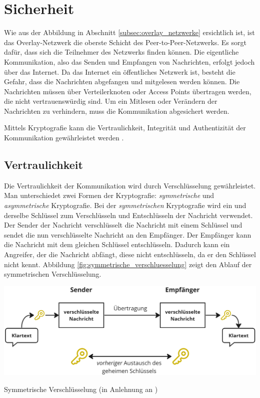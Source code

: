 \section{Sicherheit}
\label{sec:sicherheit_basics}

Wie aus der Abbildung in Abschnitt \ref{subsec:overlay_netzwerke} \textit{} ersichtlich ist, ist das Overlay-Netzwerk die oberste Schicht des Peer-to-Peer-Netzwerks. Es sorgt dafür, dass sich die Teilnehmer des Netzwerks finden können. Die eigentliche Kommunikation, also das Senden und Empfangen von Nachrichten, erfolgt jedoch über das Internet. Da das Internet ein öffentliches Netzwerk ist, besteht die Gefahr, dass die Nachrichten abgefangen und mitgelesen werden können. Die Nachrichten müssen über Verteilerknoten oder Access Points übertragen werden, die nicht vertrauenswürdig sind. Um ein Mitlesen oder Verändern der Nachrichten zu verhindern, muss die Kommunikation abgesichert werden. 

Mittels Kryptografie kann die Vertraulichkeit, Integrität und Authentizität der Kommunikation gewährleistet werden \Parencite[S. 7]{Hellmann_IT-Sicherheit}.


\subsection{Vertraulichkeit}
\label{subsec:vertraulichkeit_basics}

Die Vertraulichkeit der Kommunikation wird durch Verschlüsselung gewährleistet. Man unterschiedet zwei Formen der Kryptografie: \textit{symmetrische} und \textit{asymmetrische} Kryptografie. Bei der \textit{symmetrischen} Kryptografie wird ein und derselbe Schlüssel zum Verschlüsseln und Entschlüsseln der Nachricht verwendet. Der Sender der Nachricht verschlüsselt die Nachricht mit einem Schlüssel und sendet die nun verschlüsselte Nachricht an den Empfänger. Der Empfänger kann die Nachricht mit dem gleichen Schlüssel entschlüsseln. Dadurch kann ein Angreifer, der die Nachricht abfängt, diese nicht entschlüsseln, da er den Schlüssel nicht kennt. Abbildung \ref{fig:symmetrische_verschluesselung} zeigt den Ablauf der symmetrischen Verschlüsselung.

\begin{center}
    \captionsetup{type=figure}
    \includegraphics[width=1\linewidth]{images/symmetric_encryption.png}
    \caption{Symmetrische Verschlüsselung (in Anlehnung an \cite{ElektronikKompendium_symmetrischeVerschluesselung})}
    \label{fig:symmetrische_verschluesselung}
\end{center}

